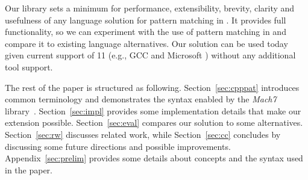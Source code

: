 

\noindent
Our library sets a minimum for performance, extensibility, brevity, 
clarity and usefulness of any language solution for pattern matching 
in \Cpp{}. It provides full functionality, so we can experiment with the use of 
pattern matching in \Cpp{} and compare it to existing language alternatives.
Our solution can be used today given 
current support of \Cpp{}11 (e.g., GCC and Microsoft \Cpp{}) without any 
additional tool support.

The rest of the paper is structured as following. Section~\ref{sec:cpppat} 
introduces common terminology and demonstrates the syntax enabled by the 
\emph{Mach7} library~\cite{TS12}. Section~\ref{sec:impl} provides some 
implementation details that make our extension possible. Section~\ref{sec:eval} 
compares our solution to some alternatives. Section~\ref{sec:rw} discusses 
related work, while Section~\ref{sec:cc} concludes by discussing some future 
directions and possible improvements. Appendix~\ref{sec:prelim} provides some 
details about \Cpp{} concepts and the syntax used in the paper.
